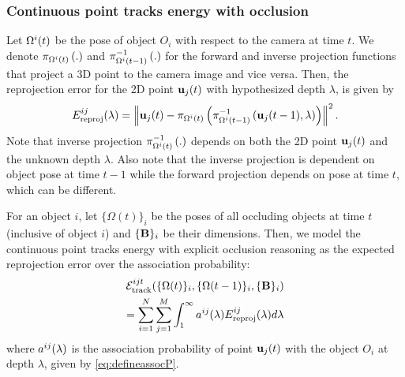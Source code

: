 \subsubsection{Continuous point tracks energy with occlusion}
\label{sec:totalContPtTracksEnergy}

Let $\Omega^{i}(t)$ be the pose of object $O_i$ with respect to the camera at time $t$. We denote $\pi_{\Omega^{i}(t)}\left(.\right)$ and $\pi^{-1}_{\Omega^{i}(t-1)}\left(.\right)$ for the forward and inverse projection functions that project a 3D point to the camera image and vice versa. Then, the reprojection error for the 2D point $\mathbf{u}_j(t)$ with hypothesized depth $\lambda$, is given by
\begin{equation}
E^{ij}_{\text{reproj}}(\lambda) = \left\|\mathbf{u}_j(t) - \pi_{\Omega^{i}(t)}\left(\pi^{-1}_{\Omega^{i}(t-1)}\left(\mathbf{u}_j(t-1), \lambda\right)\right)\right\|^2.
\label{eq:reprojerror}
\end{equation}
Note that inverse projection $\pi^{-1}_{\Omega^{i}(t)}\left(.\right)$ depends on both the 2D point $\mathbf{u}_j(t)$ and the unknown depth $\lambda$. Also note that the inverse projection is dependent on object pose at time $t-1$ while the forward projection depends on pose at time $t$, which can be different.

For an object $i$, let $\{ \Omega (t) \}_i$ be the poses of all occluding objects at time $t$ (inclusive of object $i$) and $ \{ \mathbf{B} \}_i$ be their dimensions. Then, we model the continuous point tracks energy with explicit occlusion reasoning as the expected reprojection error over the association probability:
\begin{multline}
  \mathcal{E}^{ijt}_{\text{track}}(\{ \Omega (t) \}_i, \{ \Omega (t-1) \}_i, \{ \mathbf{B} \}_i )
  \\
    = \sum_{i=1}^{N} 
    \sum_{j = 1}^{M}
    \int_1^\infty a^{ij}(\lambda)E^{ij}_{\text{reproj}}(\lambda) d\lambda
\end{multline}
where $a^{ij}(\lambda)$ is the association probability of point $\mathbf{u}_j(t)$ with the object $O_i$ at depth $\lambda$, given by \eqref{eq:defineassocP}.


